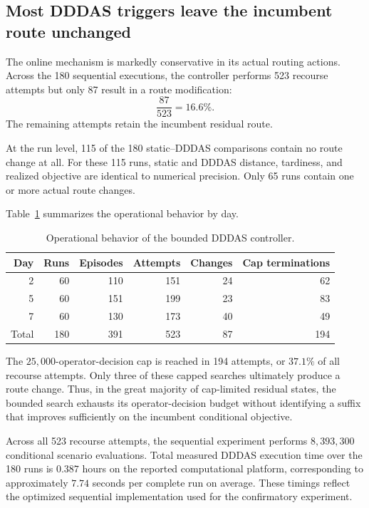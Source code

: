 \documentclass[preprint,12pt]{elsarticle}
\newcommand{\1}{\mathbf{1}}
\begin{document}
\subsection{Most DDDAS triggers leave the incumbent route unchanged}
\label{subsec:results_dddas_operations}

The online mechanism is markedly conservative in its actual routing actions.
Across the 180 sequential executions, the controller performs 523 recourse
attempts but only 87 result in a route modification:
\begin{equation}
	\frac{87}{523}
	=
	16.6\%.
\end{equation}
The remaining attempts retain the incumbent residual route.

At the run level, 115 of the 180 static--DDDAS comparisons contain no route
change at all. For these 115 runs, static and DDDAS distance, tardiness, and
realized objective are identical to numerical precision.
Only 65 runs contain one or more actual route changes.

Table~\ref{tab:dddas_operational} summarizes the operational behavior by day.

\begin{table}[t]
	\centering
	\caption{Operational behavior of the bounded DDDAS controller.}
	\label{tab:dddas_operational}
	\begin{tabular}{rrrrrr}
		\toprule
		Day &
		Runs &
		Episodes &
		Attempts &
		Changes &
		Cap terminations \\
		\midrule
		2 & 60 & 110 & 151 & 24 & 62 \\
		5 & 60 & 151 & 199 & 23 & 83 \\
		7 & 60 & 130 & 173 & 40 & 49 \\
		\midrule
		Total &
		180 & 391 & 523 & 87 & 194 \\
		\bottomrule
	\end{tabular}
\end{table}

The $25{,}000$-operator-decision cap is reached in 194 attempts,
or $37.1\%$ of all recourse attempts.
Only three of these capped searches ultimately produce a route change.
Thus, in the great majority of cap-limited residual states, the bounded search
exhausts its operator-decision budget without identifying a suffix that
improves sufficiently on the incumbent conditional objective.

Across all 523 recourse attempts, the sequential experiment performs
$8{,}393{,}300$ conditional scenario evaluations.
Total measured DDDAS execution time over the 180 runs is $0.387$ hours on the
reported computational platform, corresponding to approximately $7.74$ seconds
per complete run on average. These timings reflect the optimized sequential
implementation used for the confirmatory experiment.
\end{document}
